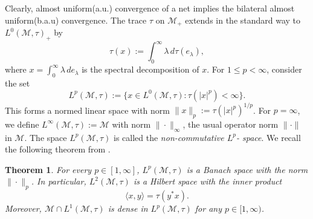 \documentclass[11pt]{amsart}
\newtheorem{thm}{Theorem}[section]
\theoremstyle{definition}
\theoremstyle{myremark}
\numberwithin{equation}{section}
\begin{document}
 Clearly, almost uniform(a.u.) convergence of a net implies the bilateral almost uniform(b.a.u) convergence. 
The trace \(\tau\) on \(\mathcal{M}_+\) extends in the standard way to \(L^{0}(\mathcal{M},\tau)_+\) by
\[
\tau(x) := \int_0^{\infty} \lambda \, d\tau(e_\lambda),
\]
where \(x = \int_{0}^{\infty} \lambda\, de_\lambda\) is the spectral decomposition of \(x\).
 For $1\leq p <\infty$, 
consider the set 
$$L^p(\mathcal{M}, \tau):=\{x\in L^0(\mathcal{M},\tau): \tau(|x|^p)<\infty\}.$$
This forms a normed linear space with norm $\|x\|_p:=\tau(|x|^p)^{1/p}$. For $p=\infty$, we define $L^\infty(\mathcal{M}, \tau):= \mathcal{M}$ with norm $\|\cdot\|_\infty$, the usual operator norm $\|\cdot\|$ in $\mathcal{M}$. The space $L^p(\mathcal{M}, \tau)$ is called the \textit{non-commutative $L^p$- space}. 
We recall the following theorem from \cite{hiai2021lectures}.
\begin{thm}\label{Density_thm}
    For every \(p \in [1,\infty]\), $L^p(\mathcal{M}, \tau)$ is a Banach space with the norm
\(\|\cdot\|_p\). In particular, $L^2(\mathcal{M}, \tau)$ is a Hilbert space with the inner
product
\[
\langle x,y\rangle = \tau(y^*x).
\]
Moreover, $ \mathcal{M} \cap L^1(\mathcal{M}, \tau)$
is dense in $L^p(\mathcal{M}, \tau)$ for any \(p \in [1,\infty)\).
\end{thm}


\end{document}
